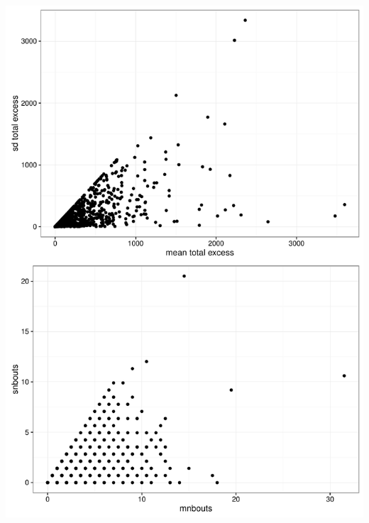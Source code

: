 \documentclass[11pt]{article}\usepackage[]{graphicx}\usepackage[]{color}
\makeatletter
\def\maxwidth{ %
  \ifdim\Gin@nat@width>\linewidth
    \linewidth
  \else
    \Gin@nat@width
  \fi
}
\newenvironment{knitrout}{}{} %
\makeatother
\begin{document}
\begin{knitrout}
\color{fgcolor}
\includegraphics[width=\maxwidth]{figure/p1b-1} 

\end{knitrout}
\end{document}
